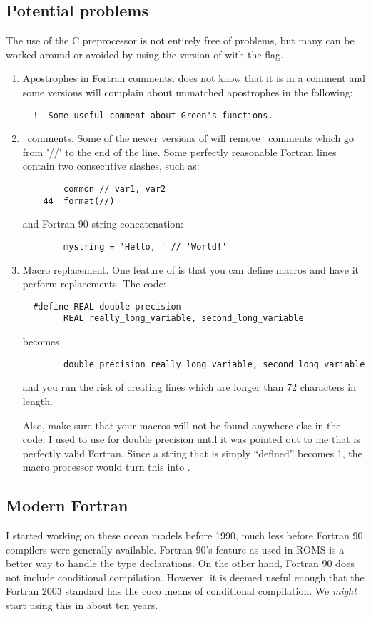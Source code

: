 \subsection{Potential problems}
The use of the C preprocessor is not entirely free of problems, but
many can be worked around or avoided by using the  version of
 with the  flag.
   \begin{enumerate}
     \item Apostrophes in Fortran comments.   does not
     know that it is in a comment and some versions will complain about
     unmatched apostrophes in the following:
     \begin{verbatim}
  !  Some useful comment about Green's functions.
     \end{verbatim}
     \item \CC\ comments.  Some of the newer versions of
      will remove \CC\ comments which go from '//' to
     the end of the line.  Some perfectly reasonable Fortran lines
     contain two consecutive slashes, such as:
     \begin{verbatim}
        common // var1, var2
    44  format(//)
     \end{verbatim}
     and Fortran 90 string concatenation:
     \begin{verbatim}
        mystring = 'Hello, ' // 'World!'
     \end{verbatim}
     \item Macro replacement.  One feature of  is that you
     can define macros and have it perform replacements.  The code:
     \begin{verbatim}
  #define REAL double precision
        REAL really_long_variable, second_long_variable
     \end{verbatim}
     becomes
     \begin{verbatim}
        double precision really_long_variable, second_long_variable
     \end{verbatim}
     and you run the risk of creating lines which are longer than 72
     characters in length.

     Also, make sure that your macros will not be found anywhere else
     in the code.  I used to use  for double
     precision until it was pointed out to me that 
      is perfectly valid Fortran.  Since a string
     that is simply ``defined'' becomes 1, the macro processor would
     turn this into .
  \end{enumerate}

\subsection{Modern Fortran}
I started working on these ocean models before 1990, much less before
Fortran 90 compilers were generally available.  Fortran 90's 
feature as used in ROMS is a better way to handle the 
type declarations.  On the other hand, Fortran 90 does not include
conditional compilation.  However, it is deemed useful enough that the
Fortran 2003 standard has the coco means of conditional compilation.
We {\em might} start using this in about ten years.
